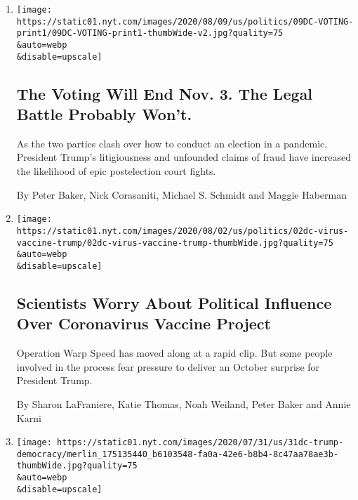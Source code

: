 \begin{enumerate}
\def\labelenumi{\arabic{enumi}.}
\item
  \href{/2020/08/08/us/politics/voting-nov-3-election.html}{}

  \texttt{[image: https://static01.nyt.com/images/2020/08/09/us/politics/09DC-VOTING-print1/09DC-VOTING-print1-thumbWide-v2.jpg?quality=75\\\&auto=webp\\\&disable=upscale]}

  \hypertarget{the-voting-will-end-nov-3-the-legal-battle-probably-wont}{%
  \subsection{The Voting Will End Nov. 3. The Legal Battle Probably
  Won't.}\label{the-voting-will-end-nov-3-the-legal-battle-probably-wont}}

  As the two parties clash over how to conduct an election in a
  pandemic, President Trump's litigiousness and unfounded claims of
  fraud have increased the likelihood of epic postelection court fights.

  By Peter Baker, Nick Corasaniti, Michael S. Schmidt and Maggie
  Haberman
\item
  \href{/2020/08/02/us/politics/coronavirus-vaccine.html}{}

  \texttt{[image: https://static01.nyt.com/images/2020/08/02/us/politics/02dc-virus-vaccine-trump/02dc-virus-vaccine-trump-thumbWide.jpg?quality=75\\\&auto=webp\\\&disable=upscale]}

  \hypertarget{scientists-worry-about-political-influence-over-coronavirus-vaccine-project}{%
  \subsection{Scientists Worry About Political Influence Over
  Coronavirus Vaccine
  Project}\label{scientists-worry-about-political-influence-over-coronavirus-vaccine-project}}

  Operation Warp Speed has moved along at a rapid clip. But some people
  involved in the process fear pressure to deliver an October surprise
  for President Trump.

  By Sharon LaFraniere, Katie Thomas, Noah Weiland, Peter Baker and
  Annie Karni
\item
  \href{/2020/07/31/us/politics/trump-tweet-democracy.html}{}

  \texttt{[image: https://static01.nyt.com/images/2020/07/31/us/31dc-trump-democracy/merlin\_175135440\_b6103548-fa0a-42e6-b8b4-8c47aa78ae3b-thumbWide.jpg?quality=75\\\&auto=webp\\\&disable=upscale]}


\end{enumerate}
